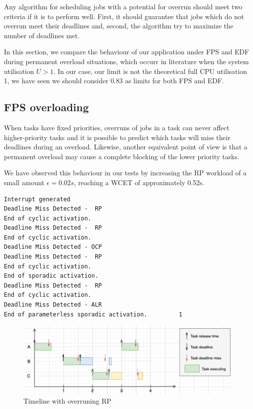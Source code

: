 \documentclass{article}
\begin{document}
Any algorithm for scheduling jobs with a potential for overrun should meet two criteria if it is to perform well. First, it should guarantee that jobs which do not overrun meet their deadlines and, second, the algorithm try to maximize the number of deadlines met.

In this section, we compare the behaviour of our application under FPS and EDF during permanent overload situations, which occurr in literature when the system utilisation $U > 1$. In our case, our limit is not the theoretical full CPU utilisation 1, we have seen we should consider 0.83 as limits for both FPS and EDF.

\subsection{FPS overloading}

When tasks have fixed priorities, overruns of jobs in a task can never affect higher-priority tasks and it is possible to predict which tasks will miss their deadlines during an overload. Likewise, another equivalent point of view is that a permanent overload may cause a complete blocking of the lower priority tasks.

We have observed this behaviour in our tests by increasing the RP workload of a small amount $\epsilon = 0.02s$, reaching a WCET of approximately 0.52s.

\begin{lstlisting}
Interrupt generated
Deadline Miss Detected -  RP
End of cyclic activation.
Deadline Miss Detected -  RP
End of cyclic activation.
Deadline Miss Detected - OCP
Deadline Miss Detected -  RP
End of cyclic activation.
End of sporadic activation.
Deadline Miss Detected -  RP
End of cyclic activation.
Deadline Miss Detected - ALR
End of parameterless sporadic activation.         1
\end{lstlisting}

\begin{figure}[!htbp]
\centering
\includegraphics[width=6.5in]{images/timeline-overload-fps-rp}
\caption{Timeline with overruning RP}
\label{timeline-overload-fps-rp}
\end{figure}
\end{document}
